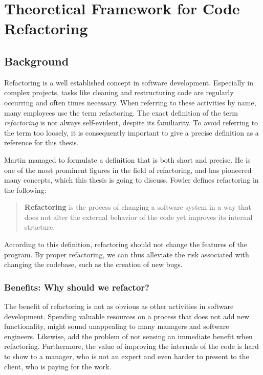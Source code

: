 \chapter{Theoretical Framework for Code Refactoring}

\section{Background}
\label{sec:background}


Refactoring is a well established concept in software development.
Especially in complex projects, 
	tasks like cleaning and restructuring code are regularly occurring and often times necessary. 
When referring to these activities by name, many employees use the term refactoring. 
The exact definition of the term \emph{refactoring} is not always self-evident,
	despite its familiarity.
To avoid referring to the term too loosely, 
	it is consequently important to give a precise definition as a reference for this thesis. 

Martin \textcite[p. ~xiv]{fowler2018} managed to formulate a definition that is both short and precise. 
He is one of the most prominent figures in the field of refactoring, 
	and has pioneered many concepts, which this thesis is going to discuss.
Fowler defines refactoring in the following:
\begin{quote}
\textbf{Refactoring} is the process of changing a software system in a way 
	that does not alter the external behavior of the code yet improves its internal structure.
\end{quote}

According to this definition, 
	refactoring should not change the features of the program.
By proper refactoring, 
	we can thus alleviate the risk associated with changing the codebase, 
    such as the creation of new bugs.



\clearpage
\subsection{Benefits: Why should we refactor?}

The benefit of refactoring is not as obvious as other activities in software development. 
Spending valuable resources on a process that does not add new functionality, 
	might sound unappealing to many managers and software engineers.
Likewise, \textcite[p.~1]{kim2012} add the problem of not sensing an immediate benefit when refactoring.
Furthermore, the value of improving the internals of the code is hard to show to a manager, 
	who is not an expert and even harder to present to the client, who is paying for the work.


